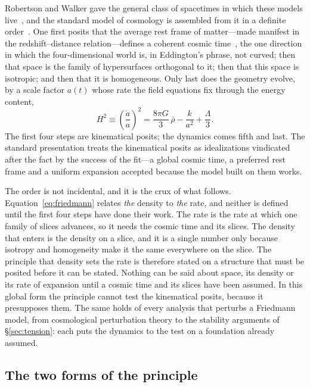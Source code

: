 \documentclass[11pt,a4paper]{article}
\begin{document}
Robertson and Walker gave the general class of spacetimes in which these models live~\cite{Robertson1929, Robertson1933, Robertson1935, Walker1937}, and the standard model of cosmology is assembled from it in a definite order~\cite{north1965}. One first posits that the average rest frame of matter---made manifest in the redshift--distance relation---defines a coherent cosmic time~\cite{Weyl1923}, the one direction in which the four-dimensional world is, in Eddington's phrase, not curved; then that space is the family of hypersurfaces orthogonal to it; then that this space is isotropic; and then that it is homogeneous. Only last does the geometry evolve, by a scale factor $a(t)$ whose rate the field equations fix through the energy content,
\begin{equation}
H^{2}\equiv\left(\frac{\dot a}{a}\right)^{2} = \frac{8\pi G}{3}\,\bar\rho - \frac{k}{a^{2}} + \frac{\Lambda}{3}.
\label{eq:friedmann}
\end{equation}
The first four steps are kinematical posits; the dynamics comes fifth and last. The standard presentation treats the kinematical posits as idealizations vindicated after the fact by the success of the fit---a global cosmic time, a preferred rest frame and a uniform expansion accepted because the model built on them works.

The order is not incidental, and it is the crux of what follows. Equation~\eqref{eq:friedmann} relates \emph{the} density to \emph{the} rate, and neither is defined until the first four steps have done their work. The rate is the rate at which one family of slices advances, so it needs the cosmic time and its slices. The density that enters is the density on a slice, and it is a single number only because isotropy and homogeneity make it the same everywhere on the slice. The principle that density sets the rate is therefore stated on a structure that must be posited before it can be stated. Nothing can be said about space, its density or its rate of expansion until a cosmic time and its slices have been assumed. In this global form the principle cannot test the kinematical posits, because it presupposes them. The same holds of every analysis that perturbs a Friedmann model, from cosmological perturbation theory to the stability arguments of \S\ref{sec:tension}: each puts the dynamics to the test on a foundation already assumed.

\subsection{The two forms of the principle}\label{sec:twoforms}
\end{document}
